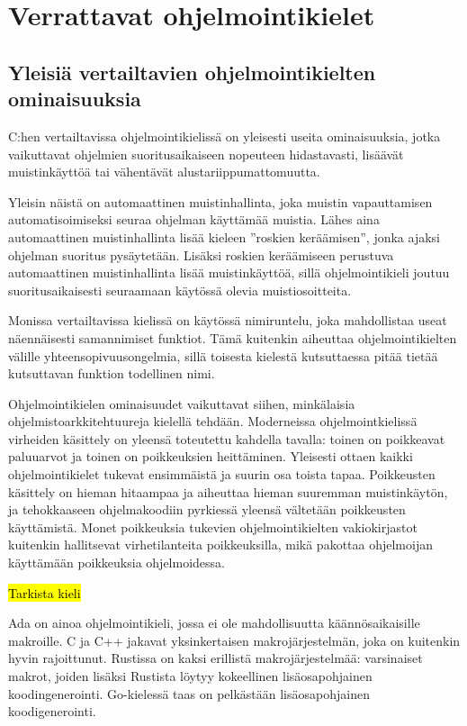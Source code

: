 \section{Verrattavat ohjelmointikielet}
\label{sec:muut}

\subsection{Yleisiä vertailtavien ohjelmointikielten ominaisuuksia}

C:hen vertailtavissa ohjelmointikielissä on yleisesti useita ominaisuuksia,
jotka vaikuttavat ohjelmien suoritusaikaiseen nopeuteen hidastavasti, lisäävät
muistinkäyttöä tai vähentävät alustariippumattomuutta.

Yleisin näistä on automaattinen muistinhallinta, joka muistin vapauttamisen
automatisoimiseksi seuraa ohjelman käyttämää muistia. Lähes aina automaattinen
muistinhallinta lisää kieleen ''roskien keräämisen'', jonka ajaksi ohjelman suoritus pysäytetään. Lisäksi roskien
keräämiseen perustuva automaattinen muistinhallinta lisää muistinkäyttöä, sillä
ohjelmointikieli joutuu suoritusaikaisesti seuraamaan käytössä olevia
muistiosoitteita.

Monissa vertailtavissa kielissä on käytössä nimiruntelu,
joka mahdollistaa useat näennäisesti samannimiset funktiot. Tämä kuitenkin
aiheuttaa ohjelmointikielten välille yhteensopivuusongelmia, sillä toisesta
kielestä kutsuttaessa pitää tietää kutsuttavan funktion todellinen nimi.

Ohjelmointikielen ominaisuudet vaikuttavat siihen, minkälaisia
ohjelmistoarkkitehtuureja kielellä tehdään\citationneeded. Moderneissa
ohjelmointkielissä virheiden käsittely on yleensä toteutettu kahdella tavalla:
toinen on poikkeavat paluuarvot ja toinen on poikkeuksien heittäminen.
Yleisesti ottaen kaikki ohjelmointikielet tukevat ensimmäistä ja suurin osa
toista tapaa. Poikkeusten käsittely on hieman hitaampaa ja aiheuttaa hieman
suuremman muistinkäytön, ja tehokkaaseen ohjelmakoodiin pyrkiessä yleensä
vältetään poikkeusten käyttämistä\citationneeded. Monet poikkeuksia tukevien
ohjelmointikielten vakiokirjastot kuitenkin hallitsevat virhetilanteita
poikkeuksilla, mikä pakottaa ohjelmoijan käyttämään poikkeuksia ohjelmoidessa.

\hl{Tarkista kieli}

Ada on ainoa ohjelmointikieli, jossa ei ole mahdollisuutta käännösaikaisille
makroille. C ja C++ jakavat yksinkertaisen makrojärjestelmän, joka on
kuitenkin hyvin rajoittunut. Rustissa on kaksi erillistä makrojärjestelmää:
varsinaiset makrot, joiden lisäksi Rustista löytyy kokeellinen lisäosapohjainen
koodingenerointi. Go-kielessä taas on pelkästään lisäosapohjainen
koodigenerointi.

